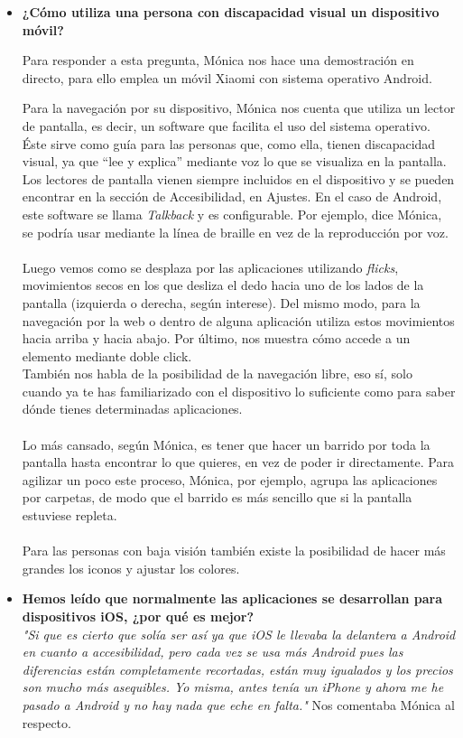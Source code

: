 \documentclass{article}
\begin{document}
	\begin{itemize}
		\item  \textbf{¿Cómo utiliza una persona con discapacidad visual un dispositivo móvil?}
		
		Para responder a esta pregunta, Mónica nos hace una demostración en directo, para ello emplea un móvil Xiaomi con sistema operativo Android.
				
		Para la navegación por su dispositivo, Mónica nos cuenta que utiliza un lector de pantalla, es decir, un software que facilita el uso del sistema operativo. Éste sirve como guía para las personas que, como ella, tienen discapacidad visual, ya que ``lee y explica'' mediante voz lo que se visualiza en la pantalla. Los lectores de pantalla vienen siempre incluidos en el dispositivo y se pueden encontrar en la sección de Accesibilidad, en Ajustes. En el caso de Android, este software se llama \textit{Talkback} y es configurable. Por ejemplo, dice Mónica, se podría usar mediante la línea de braille en vez de la reproducción por voz.
		\\
		\\
		Luego vemos como se desplaza por las aplicaciones utilizando \textit{flicks}, movimientos secos en los que desliza el dedo hacia uno de los lados de la pantalla (izquierda o derecha, según interese). Del mismo modo, para la navegación por la web o dentro de alguna aplicación utiliza estos movimientos hacia arriba y hacia abajo. Por último, nos muestra cómo accede a un elemento mediante doble click. 
		\\
		También nos habla de la posibilidad de la navegación libre, eso sí, solo cuando ya te has familiarizado con el dispositivo lo suficiente como para saber dónde tienes determinadas aplicaciones. 
		\\
		\\
		Lo más cansado, según Mónica, es tener que hacer un barrido por toda la pantalla hasta encontrar lo que quieres, en vez de poder ir directamente. Para agilizar un poco este proceso, Mónica, por ejemplo, agrupa las aplicaciones por carpetas, de modo que el barrido es más sencillo que si la pantalla estuviese repleta.
		\\
		\\
		Para las personas con baja visión también existe la posibilidad de hacer más grandes los iconos y ajustar los colores.
		\\
		
		\item \textbf{Hemos leído que normalmente las aplicaciones se desarrollan para dispositivos iOS, ¿por qué es mejor?} 
		\\
		\textit{"Si que es cierto que solía ser así ya que iOS le llevaba la delantera a Android en cuanto a accesibilidad, pero cada vez se usa más Android pues las diferencias están completamente recortadas, están muy igualados y los precios son mucho más asequibles. Yo misma, antes tenía un iPhone y ahora me he pasado a Android y no hay nada que eche en falta."} Nos comentaba Mónica al respecto.
		

\end{itemize}
\end{document}
